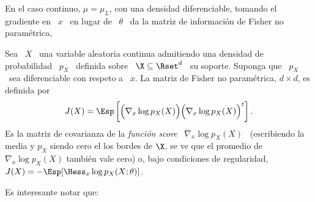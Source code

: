 En el caso  continuo, $\mu = \mu_L$, con una  densidad diferenciable, tomando el
gradiente en \ $x$  \ en lugar de \ $\theta$ \ da  la matriz de informaci\'on de
Fisher no param\'etrica,
%
\begin{definicion}
\label{Def:SZ:MatrizFisherNoParametrica}
%
  Sea  \  $X$ \  una  variable aleatoria  continua  admitiendo  una densidad  de
  probabilidad \ $p_X$  \ definida sobre \ $\X \subseteq  \Rset^d$ \ su soporte.
  Suponga que  \ $p_X$ \ sea  diferenciable con respeto  a \ $x$.  La  matriz de
  Fisher no param\'etrica, $d \times d$, es definida por
  \[
  J(X) =  \Esp\left[ \Big(  \nabla_x \log p_X(X)  \Big) \Big(  \nabla_x \log
      p_X(X) \Big)^t \right].
  \]
  Es  la matriz  de covarianza  de  la {\it  funci\'on score}  \ $\nabla_x  \log
  p_X(X)$ \ (escribiendo la media y $p_X$  siendo cero el los bordes de $\X$, se
  ve que  el promedio  de $\nabla_x  \log p_X(X)$ tambi\'en  vale cero)  o, bajo
  condiciones de regularidad, $J(X) = - \Esp[\Hess_x \log p_X(X;\theta)]$.
\end{definicion}
%
Es interesante notar que:
%
